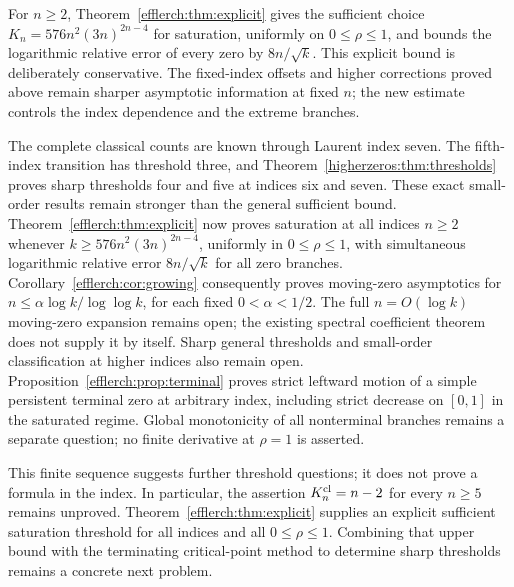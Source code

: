 For $n\ge2$, Theorem~\ref{efflerch:thm:explicit} gives the sufficient
choice $K_n=576n^2(3n)^{2n-4}$ for saturation, uniformly on
$0\le\rho\le1$, and bounds the logarithmic relative error of every
zero by $8n/\sqrt{k}$. This explicit bound is deliberately conservative.
The fixed-index offsets and higher corrections proved above remain
sharper asymptotic information at fixed $n$; the new estimate controls
the index dependence and the extreme branches.

The complete classical counts are known through Laurent index seven.
The fifth-index transition has threshold three, and
Theorem~\ref{higherzeros:thm:thresholds} proves sharp thresholds four
and five at indices six and seven. These exact small-order results
remain stronger than the general sufficient bound.
Theorem~\ref{efflerch:thm:explicit} now proves saturation at all indices
$n\ge2$ whenever $k\ge576n^2(3n)^{2n-4}$, uniformly in
$0\le\rho\le1$, with simultaneous logarithmic relative error
$8n/\sqrt{k}$ for all zero branches.
Corollary~\ref{efflerch:cor:growing} consequently proves moving-zero
asymptotics for $n\le\alpha\log k/\log\log k$, for each fixed
$0<\alpha<1/2$. The full $n=O(\log k)$ moving-zero expansion remains
open; the existing spectral coefficient theorem does not supply it by
itself. Sharp general thresholds and small-order classification at
higher indices also remain open. Proposition~\ref{efflerch:prop:terminal}
proves strict leftward motion of a simple persistent terminal zero at
arbitrary index, including strict decrease on $[0,1]$ in the saturated
regime. Global monotonicity of all nonterminal branches remains a
separate question; no finite derivative at $\rho=1$ is asserted.

This finite sequence suggests further threshold questions; it does not
prove a formula in the index. In particular, the assertion
$K_n^{\rm cl}=n-2$ for every $n\ge5$ remains unproved.
Theorem~\ref{efflerch:thm:explicit} supplies an explicit sufficient
saturation threshold for all indices and all $0\le\rho\le1$.
Combining that upper bound with the terminating critical-point method
to determine sharp thresholds remains a concrete next problem.

